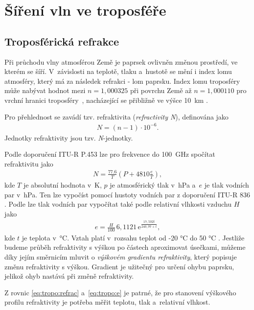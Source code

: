 \documentclass[twoside]{ctuthesis}
\newcommand{\mt}[1]{\text{#1}}
\theoremstyle{plain}
\theoremstyle{definition}
\theoremstyle{note}
\begin{document}
	\section{Šíření vln ve troposféře}
		\subsection{Troposférická refrakce}
		Při průchodu vlny atmosférou Země je paprsek ovlivněn změnou prostředí, ve kterém se šíří. V~závislosti na teplotě, tlaku a~hustotě se mění i index lomu atmosféry, který má za následek refrakci - lom paprsku. Index lomu troposféry může nabývat hodnot mezi $n=1{,}000325$ při povrchu Země až $n=1{,}000110$ pro vrchní hranici troposféry~\cite{zaklady:sireni:vln}, nacházející se přibližně ve výšce 10~km \cite{web_tropo}.

		Pro přehlednost se zavádí tzv. refraktivita (\textit{refractivity N}), definována jako
		\begin{align}
			N = (n-1)\cdot 10^{-6}.
		\end{align}
		Jednotky refraktivity jsou tzv. \textit{N}-jednotky.

		Podle doporučení ITU-R P.453 \cite{ITU:refrac} lze pro frekvence do 100~GHz spočítat refraktivitu jako
		\begin{align}
			N = \frac{77.6}{T} \left(P + 4810\frac{e}{T}\right),
			\label{eq:tropo:refrac}
		\end{align}
		kde $T$ je absolutní hodnota v~K, $p$ je atmosférický tlak v~hPa a~$e$ je tlak vodních par v~hPa. Ten lze vypočíst pomocí hustoty vodních par z doporučení ITU-R 836 \cite{ITU:vapour}. Podle \cite{ITU:refrac} lze tlak vodních par vypočítat také podle relativní vlhkosti vzduchu $H$ jako
		\begin{align}
			e = \frac{H}{100}\,6{,}1121\,\mt{e}^{\frac{17{,}502t}{240{,}97 + t}},
			\label{eq:tropo:e}
		\end{align}
		kde $t$ je teplota v~°C. Vztah platí v~rozsahu teplot od -20 °C do 50 °C \cite{zaklady:sireni:vln}. Jestliže budeme průběh refraktivity s výškou po částech aproximovat úsečkami, můžeme díky jejím směrnicím mluvit o \textit{výškovém gradientu refraktivity}, který popisuje změnu refraktivity s výškou. Gradient je užitečný pro určení ohybu paprsku, jelikož ohyb nastává při změně refraktivity. 

		Z rovnic \eqref{eq:tropo:refrac} a~\eqref{eq:tropo:e} je patrné, že pro stanovení výškového profilu refraktivity je potřeba měřit teplotu, tlak a~relativní vlhkost. 
\end{document}
